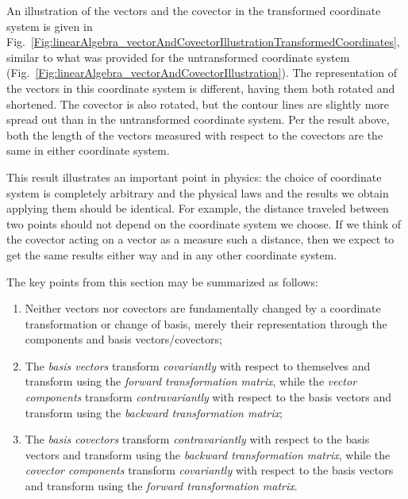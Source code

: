 An illustration of the vectors and the covector in the transformed coordinate system is given in Fig.~\ref{Fig:linearAlgebra_vectorAndCovectorIllustrationTransformedCoordinates}, similar to what was provided for the untransformed coordinate system (Fig.~\ref{Fig:linearAlgebra_vectorAndCovectorIllustration}). The representation of the vectors in this coordinate system is different, having them both rotated and shortened. The covector is also rotated, but the contour lines are slightly more spread out than in the untransformed coordinate system. Per the result above, both the length of the vectors measured with respect to the covectors are the same in either coordinate system.

This result illustrates an important point in physics: the choice of coordinate system is completely arbitrary and the physical laws and the results we obtain applying them should be identical. For example, the distance traveled between two points should not depend on the coordinate system we choose. If we think of the covector acting on a vector as a measure such a distance, then we expect to get the same results either way and in any other coordinate system. 

The key points from this section may be summarized as follows:
\begin{enumerate}
  \item Neither vectors nor covectors are fundamentally changed by a coordinate transformation or change of basis, merely their representation through the components and basis vectors/covectors;
  \item The \emph{basis vectors} transform \emph{covariantly} with respect to themselves and transform using the \emph{forward transformation matrix}, while the \emph{vector components} transform \emph{contravariantly} with respect to the basis vectors and transform using the \emph{backward transformation matrix}; 
  \item The \emph{basis covectors} transform \emph{contravariantly} with respect to the basis vectors and transform using the \emph{backward transformation matrix}, while the \emph{covector components} transform \emph{covariantly} with respect to the basis vectors and transform using the \emph{forward transformation matrix}.
\end{enumerate}

